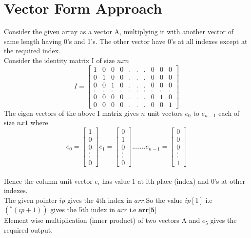 \documentclass[journal,12pt,twocolumn]{IEEEtran}
\begin{document}
\section{Vector Form Approach}
Consider the given array as a vector A, multiplying it with another vector of same length having 0's and 1's. 
The other vector have 0's at all indexes except at the required index.
\\
Consider the identity matrix I of size $nxn$
\\
\[I = 
	\begin{bmatrix}
		1 & 0 & 0 & 0 & . & . & . & 0 & 0 & 0
		\\
		0 & 1 & 0 & 0 & . & . & . & 0 & 0 & 0
		\\
		0 & 0 & 1 & 0 & . & . & . & 0 & 0 & 0
		\\
		. & . & . & . & . & . & . & . & . & .
		\\
		0 & 0 & 0 & 0 & . & . & . & 0 & 1 & 0
		\\
		0 & 0 & 0 & 0 & . & . & . & 0 & 0 & 1
	\end{bmatrix}
\]
The eigen vectors of the above I matrix gives $n$ unit vectors $e_{0}$ to $e_{n-1}$ each of size $nx1$ where
\\

$$
	e_{0} = 
	\begin{bmatrix}
		1
		\\
		0
		\\
		0
		\\
		.
		\\
		.
		\\
		0
	\end{bmatrix}
	e_{1} = 
	\begin{bmatrix}
		0
		\\
		1
		\\
		0
		\\
		.
		\\
		.
		\\
		0
	\end{bmatrix}
	.......
	e_{n-1} = 
	\begin{bmatrix}
		0
		\\
		0
		\\
		0
		\\
		.
		\\
		.
		\\
		1
	\end{bmatrix}
$$
\\
Hence the column unit vector $e_{i}$ has value 1 at ith place (index) and 0's at other indexes. 
\\
The given pointer $ip$ gives the 4th index in $arr$.So the value $ip[1]$ i.e $(^{*}(ip+1))$ gives the 5th index in $arr$ i.e $\textbf{arr[5]}$
\\
Element wise multiplication (inner product) of two vectors A and $e_{5}$ gives the required output.
\\
\end{document}

